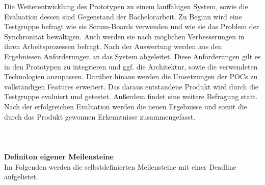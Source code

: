 \documentclass[12pt,titlepage]{scrartcl}
\begin{document}
Die Weiterentwicklung des Prototypen zu einem lauffähigen System, sowie die Evaluation dessen sind Gegenstand der Bachelorarbeit. Zu Beginn wird eine Testgruppe befragt wie sie Scrum-Boards verwenden und wie sie das Problem der Synchronität bewältigen. Auch werden sie nach möglichen Verbesserungen in ihren Arbeitsprozessen befragt. Nach der Auswertung werden aus den Ergebnissen Anforderungen an das System abgeleitet. Diese Anforderungen gilt es in den Prototypen zu integrieren und ggf. die Architektur, sowie die verwendeten Technologien anzupassen. Darüber hinaus werden die Umsetzungen der POCs zu vollständigen Features erweitert. Das daraus entstandene Produkt wird durch die Testgruppe evaluiert und getestet. Außerdem findet eine weitere Befragung statt. Nach der erfolgreichen Evaluation werden die neuen Ergebnisse und somit die durch das Produkt gewonnen Erkenntnisse zusammengefasst.
\\ \\ \\ \\
\textbf{Definiton eigener Meilensteine} \\
Im Folgenden werden die selbstdefinierten Meilensteine mit einer Deadline aufgelistet.
\end{document}
